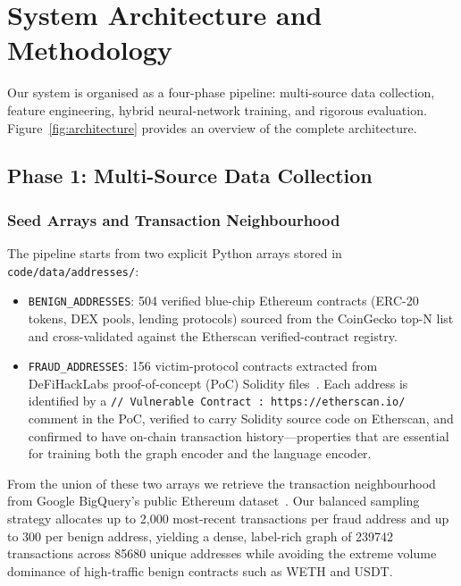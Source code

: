 \section{System Architecture and Methodology}
\label{sec:methodology}

Our system is organised as a four-phase pipeline: multi-source data
collection, feature engineering, hybrid neural-network training, and
rigorous evaluation.  Figure~\ref{fig:architecture} provides an overview
of the complete architecture.

\subsection{Phase 1: Multi-Source Data Collection}
\label{subsec:collection}

\subsubsection{Seed Arrays and Transaction Neighbourhood}
The pipeline starts from two explicit Python arrays stored in
\texttt{code/data/addresses/}:

\begin{itemize}
    \item \texttt{BENIGN\_ADDRESSES}: 504 verified blue-chip Ethereum
    contracts (ERC-20 tokens, DEX pools, lending protocols) sourced from
    the CoinGecko top-N list and cross-validated against the Etherscan
    verified-contract registry.

    \item \texttt{FRAUD\_ADDRESSES}: 156 victim-protocol contracts
    extracted from DeFiHackLabs proof-of-concept (PoC) Solidity
    files~\cite{defihacklabs2024}.  Each address is identified by a
    \texttt{// Vulnerable Contract : https://etherscan.io/} comment in
    the PoC, verified to carry Solidity source code on Etherscan, and
    confirmed to have on-chain transaction history---properties that are
    essential for training both the graph encoder and the language
    encoder.
\end{itemize}

From the union of these two arrays we retrieve the transaction
neighbourhood from Google BigQuery's public Ethereum
dataset~\cite{bigquery2024}.  Our balanced sampling strategy allocates
up to 2,000 most-recent transactions per fraud address and up to 300 per
benign address, yielding a dense, label-rich graph of \num{239742}
transactions across \num{85680} unique addresses while avoiding the
extreme volume dominance of high-traffic benign contracts such as WETH
and USDT.

